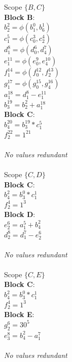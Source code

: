\documentclass[11pt]{article}
\begin{document}
\begin{enumerate}
\begin{Answer}
		      Scope $\{B, C\}$ \\
		      \textbf{Block B}: \\
		      $b_2^2 = \phi(b_1^0, b_6^1)$ \\
		      $c_1^5 = \phi(c_0^3, c_2^4)$ \\
		      $d_1^8 = \phi(d_0^6, d_4^7)$ \\
		      $e_1^{11} = \phi(e_0^9, e_4^{10})$ \\
		      $f_1^{14} = \phi(f_0^{12}, f_2^{13})$ \\
		      $g_1^{17} = \phi(g_0^{15}, g_4^{16})$ \\
		      $a_1^{18} = d_1^8 - e_1^{11}$ \\
		      $b_3^{19} = b_2^2 + a_1^{18}$ \\
		      \textbf{Block C}: \\
		      $b_4^{20} = b_3^{19} * c_1^5$ \\
		      $f_2^{22} = 1^{21}$ \\
		      \\
		      \textit{No values redundant} \\
		      \\

		      Scope $\{C, D\}$ \\
		      \textbf{Block C}: \\
		      $b_4^2 = b_3^0 * c_1^1$ \\
		      $f_2^4 = 1^3$ \\
		      \textbf{Block D}: \\
		      $e_2^6 = a_1^5 + b_4^2$ \\
		      $d_2^8 = d_1^7 - e_2^6$ \\
		      \\
		      \textit{No values redundant} \\
		      \\

		      Scope $\{C, E\}$ \\
		      \textbf{Block C}: \\
		      $b_4^2 = b_3^0 * c_1^1$ \\
		      $f_2^4 = 1^3$ \\
		      \textbf{Block E}: \\
		      $g_2^6 = 30^5$ \\
		      $e_3^8 = b_4^2 - a_1^7$ \\
		      \\
		      \textit{No values redundant} \\
		      \\


\end{Answer}
\end{enumerate}
\end{document}
